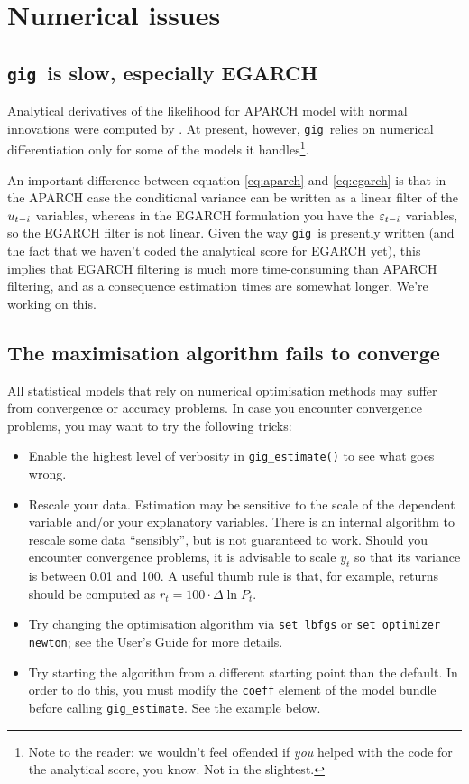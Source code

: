 \documentclass[a4paper,11pt]{article}
\newcommand{\stdu}{\ensuremath \varepsilon}
\newcommand{\uhat}{\ensuremath u}
\newcommand{\gig}{\texttt{gig}}
\begin{document}
\section{Numerical issues}
\label{sec:numerical}

\subsection{\gig\ is slow, especially EGARCH}
Analytical derivatives of the likelihood for APARCH model with normal
innovations were computed by \cite{Laurent}. At present, however,
\gig\ relies on numerical differentiation only for some of the models
it handles\footnote{Note to the reader: we wouldn't feel offended if
  \emph{you} helped with the code for the analytical score, you
  know. Not in the slightest.}. 

An important difference between equation \eqref{eq:aparch} and
\eqref{eq:egarch} is that in the APARCH case the conditional variance
can be written as a linear filter of the $\uhat_{t-i}$ variables,
whereas in the EGARCH formulation you have the $\stdu_{t-i}$
variables, so the EGARCH filter is not linear. Given the way \gig\ is
presently written (and the fact that we haven't coded the analytical
score for EGARCH yet), this implies that EGARCH filtering is much more
time-consuming than APARCH filtering, and as a consequence estimation
times are somewhat longer. We're working on this.

\subsection{The maximisation algorithm fails to converge}

All statistical models that rely on numerical optimisation methods may
suffer from convergence or accuracy problems. In case you encounter
convergence problems, you may want to try the following tricks:
\begin{itemize}
\item Enable the highest level of verbosity in
  \texttt{gig\_estimate()} to see what goes wrong.
\item Rescale your data. Estimation may be sensitive to the scale of
  the dependent variable and/or your explanatory variables. There is
  an internal algorithm to rescale some data ``sensibly'', but is not
  guaranteed to work. Should you encounter convergence problems, it is
  advisable to scale $y_t$ so that its variance is between 0.01 and
  100. A useful thumb rule is that, for example, returns should be
  computed as $r_t = 100 \cdot \Delta \ln P_t$.
\item Try changing the optimisation algorithm via \texttt{set lbfgs}
  or \texttt{set optimizer newton}; see the User's Guide for more details.
\item Try starting the algorithm from a different starting point than
  the default. In order to do this, you must modify the \texttt{coeff}
  element of the model bundle before calling
  \texttt{gig\_estimate}. See the example below.
\end{itemize}
\end{document}
